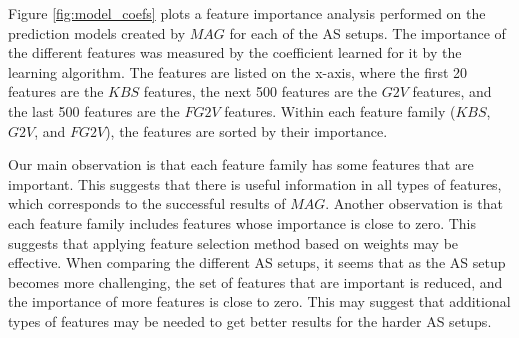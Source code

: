 \documentclass[letterpaper]{article} %
\newcommand{\Carmel}[1]{}
\newcommand{\Roni}[1]{}
\newcommand{\gtv}[1]{\ensuremath{\textit{G2V}}\xspace}
\newcommand{\fgtv}[1]{\ensuremath{\textit{FG2V}}\xspace}
\newcommand{\kaduri}[1]{\ensuremath{\textit{KBS}}\xspace}
\newcommand{\mapfgas}[1]{\ensuremath{\textit{MAG}}\xspace}
\begin{document}
Figure \ref{fig:model_coefs} plots a feature importance analysis performed on the prediction models created by \mapfgas\ for each of the AS setups. 
The importance of the different features was measured by the coefficient learned for it by the learning algorithm. 
The features are listed on the x-axis, where the first 20 features are the \kaduri\ features, the next 500 features are the \gtv\ features, and the last 500 features are the \fgtv\ features. Within each feature family (\kaduri\ ,\gtv\ , and \fgtv\ ), the features are sorted by their importance. 


Our main observation is that each feature family has some features that are important. This suggests that there is useful information in all types of features, which corresponds to the successful results of \mapfgas\ . 
Another observation is that each feature family includes features whose importance is close to zero. This suggests that applying feature selection method based on weights may be effective. 
When comparing the different AS setups, it seems that as the AS setup becomes more challenging, the set of features that are important is reduced, and the importance of more features is close to zero. This may suggest that additional types of features  may be needed to get better results for the harder AS setups. 
\end{document}

